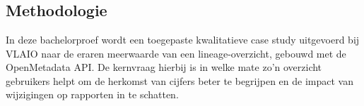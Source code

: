 
\chapter{}%
\label{ch:methodologie}



\section{Methodologie}

In deze bachelorproef wordt een toegepaste kwalitatieve case study uitgevoerd bij VLAIO naar de eraren meerwaarde van een lineage-overzicht, gebouwd met de OpenMetadata API. De kernvraag hierbij is in welke mate zo'n overzicht gebruikers helpt om de herkomst van cijfers beter te begrijpen en de impact van wijzigingen op rapporten in te schatten.\\

